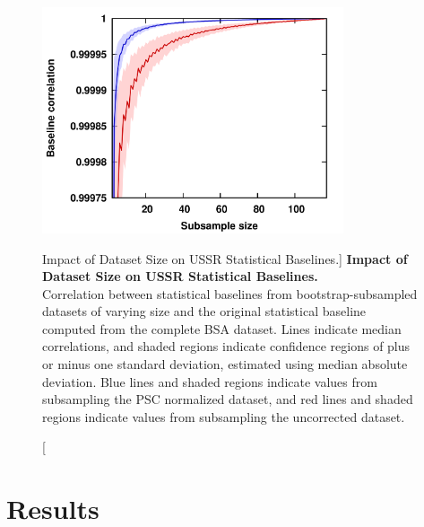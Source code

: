 \begin{figure}
\includegraphics[width=3.5in]{figs/ussr/04-blcorr.png}
\caption
      [Impact of Dataset Size on USSR Statistical Baselines.]{
  {\bf Impact of Dataset Size on USSR Statistical Baselines.}
  \\
  Correlation between statistical baselines from bootstrap-subsampled datasets
  of varying size and the original statistical baseline computed from the
  complete BSA dataset. Lines indicate median correlations, and shaded regions
  indicate confidence regions of plus or minus one standard deviation,
  estimated using median absolute deviation. Blue lines and shaded regions
  indicate values from subsampling the PSC normalized dataset, and red lines
  and shaded regions indicate values from subsampling the uncorrected dataset.
}
\label{figure.7.4}
\end{figure}

\section{Results}

